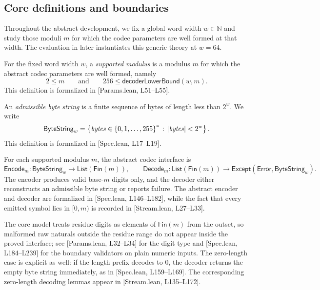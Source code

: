 \documentclass{system-security-article}
\providecommand{\href}[2]{#2}
\newcommand{\ByteString}{\mathsf{ByteString}}
\newcommand{\ByteStringBounded}{\ByteString_{w}}
\newcommand{\EncodeM}{\mathsf{Encode}_m}
\newcommand{\DecodeM}{\mathsf{Decode}_m}
\newcommand{\List}{\mathsf{List}}
\newcommand{\Fin}{\mathsf{Fin}}
\newcommand{\Except}{\mathsf{Except}}
\newcommand{\Error}{\mathsf{Error}}
\newcommand{\BaseM}{base-\(m\)}
\newcommand{\BytesVar}{\mathit{bytes}}
\newcommand{\LeanParams}[2]{\href{https://github.com/KyrylR/phd-symmetric-cryptography/blob/8e903222a7df1c4365592e4b16fa752a924b8977/lean/encoding-dr-1/EncodingProofs/BaseMLen/Params.lean\#L#1-L#2}{[Params.lean, L#1--L#2]}}
\newcommand{\LeanSpec}[2]{\href{https://github.com/KyrylR/phd-symmetric-cryptography/blob/8e903222a7df1c4365592e4b16fa752a924b8977/lean/encoding-dr-1/EncodingProofs/BaseMLen/Spec.lean\#L#1-L#2}{[Spec.lean, L#1--L#2]}}
\newcommand{\LeanStream}[2]{\href{https://github.com/KyrylR/phd-symmetric-cryptography/blob/8e903222a7df1c4365592e4b16fa752a924b8977/lean/encoding-dr-1/EncodingProofs/BaseMLen/Stream.lean\#L#1-L#2}{[Stream.lean, L#1--L#2]}}
\begin{document}
    \subsection{Core definitions and boundaries}
    \label{subsec:assumptions}

    Throughout the abstract development, we fix a global word width \(w \in \mathbb{N}\) and study those moduli \(m\)
    for which the codec parameters are well formed at that width.
    The evaluation in  later instantiates this generic theory at \(w=64\).

    \begin{definition}
        \label{def:supported-modulus}
        For the fixed word width \(w\), a \emph{supported modulus} is a modulus \(m\)
        for which the abstract codec parameters are well formed, namely
        \[
            2 \le m
            \qquad \text{and} \qquad
            256 \le \mathsf{decoderLowerBound}(w,m).
        \]
        This definition is formalized in \LeanParams{51}{55}.
    \end{definition}

    \begin{definition}
        \label{def:byte-string-bounded}
        An \emph{admissible byte string} is a finite sequence of bytes of length less than \(2^{w}\).
        We write
        \[
            \ByteStringBounded =
            \setbuild{\BytesVar \in \set{0,1,\ldots,255}^*}{\abs{\BytesVar} < 2^{w}}.
        \]
        This definition is formalized in \LeanSpec{17}{19}.
    \end{definition}

    For each supported modulus \(m\), the abstract codec interface is
    \[
        \EncodeM : \ByteStringBounded \to \List(\Fin(m)),
        \qquad
        \DecodeM : \List(\Fin(m)) \to \Except(\Error, \ByteStringBounded).
    \]
    The encoder produces valid \BaseM{} digits only, and the decoder either reconstructs an
    admissible byte string or reports failure.
    The abstract encoder and decoder are formalized in \LeanSpec{146}{182},
    while the fact that every emitted symbol lies in \([0,m)\) is recorded in \LeanStream{27}{33}.

    The core model treats residue digits as elements of \(\Fin(m)\) from the outset, so malformed raw
    naturals outside the residue range do not appear inside the proved interface; see \LeanParams{32}{34}
    for the digit type and \LeanSpec{184}{239} for the boundary validators on plain numeric inputs.
    The zero-length case is explicit as well: if the length prefix decodes to \(0\), the
    decoder returns the empty byte string immediately, as in \LeanSpec{159}{169}.
    The corresponding zero-length decoding lemmas appear in \LeanStream{135}{172}.
\end{document}
